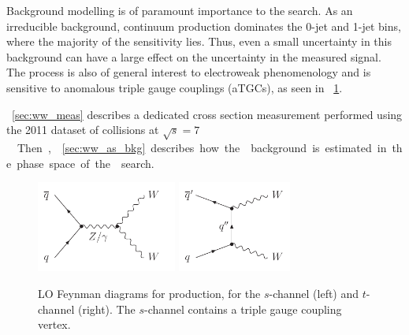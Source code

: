 
Background modelling is of paramount importance to the \HWW search. As an irreducible 
background, continuum \WWlvlv production dominates the 0-jet and 1-jet bins, where the 
majority of the sensitivity lies. Thus, even a small uncertainty in this background can 
have a large effect on the uncertainty in the measured signal. The process is also of general 
interest to electroweak phenomenology and is sensitive to anomalous triple gauge couplings 
(aTGCs), as seen in \Figure~\ref{fig:WW:feyn}.

\Section~\ref{sec:ww_meas} describes a dedicated \WW cross section measurement performed 
using the 2011 dataset of \pp collisions at \unit{$\sqrt{s} = 7$}{\TeV}. Then, 
\Section~\ref{sec:ww_as_bkg} describes how the \WW background is estimated in the phase 
space of the \HWW search.

\begin{figure}[b]
	\null\hfill
	\includegraphics[height=3cm]{axodraw/WW_schannel.pdf}
	\hfill
	\includegraphics[height=3cm]{axodraw/WW_tchannel.pdf}
	\hfill\null
	\caption{LO Feynman diagrams for \WW production, for the $s$-channel (left) and 
	$t$-channel (right). The $s$-channel contains a triple gauge coupling vertex.}
	\label{fig:WW:feyn}
\end{figure}
